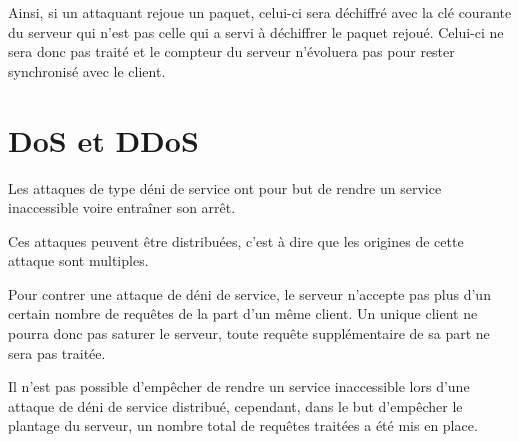 Ainsi, si un attaquant rejoue un paquet, celui-ci sera déchiffré avec la clé courante du serveur qui n'est pas celle qui a servi à déchiffrer le paquet rejoué. Celui-ci ne sera donc pas traité et le compteur du serveur n'évoluera pas pour rester synchronisé avec le client.

\clearpage

\section{DoS et DDoS}

Les attaques de type déni de service ont pour but de rendre un service inaccessible voire entraîner son arrêt.

Ces attaques peuvent être distribuées, c'est à dire que les origines de cette attaque sont multiples.

Pour contrer une attaque de déni de service, le serveur n'accepte pas plus d'un certain nombre de requêtes de la part d'un même client. Un unique client ne pourra donc pas saturer le serveur, toute requête supplémentaire de sa part ne sera pas traitée.

Il n'est pas possible d'empêcher de rendre un service inaccessible lors d'une attaque de déni de service distribué, cependant, dans le but d'empêcher le plantage du serveur, un nombre total de requêtes traitées a été mis en place.
